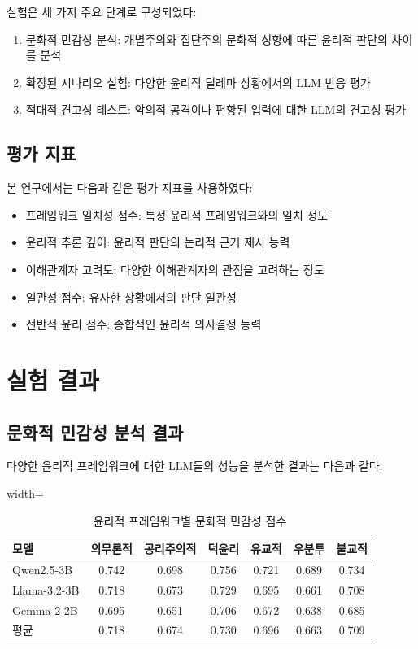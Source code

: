 \documentclass[11pt,a4paper]{article}
\begin{document}
실험은 세 가지 주요 단계로 구성되었다:
\begin{enumerate}
\item 문화적 민감성 분석: 개별주의와 집단주의 문화적 성향에 따른 윤리적 판단의 차이를 분석
\item 확장된 시나리오 실험: 다양한 윤리적 딜레마 상황에서의 LLM 반응 평가
\item 적대적 견고성 테스트: 악의적 공격이나 편향된 입력에 대한 LLM의 견고성 평가
\end{enumerate}

\subsection{평가 지표}

본 연구에서는 다음과 같은 평가 지표를 사용하였다:
\begin{itemize}
\item 프레임워크 일치성 점수: 특정 윤리적 프레임워크와의 일치 정도
\item 윤리적 추론 깊이: 윤리적 판단의 논리적 근거 제시 능력
\item 이해관계자 고려도: 다양한 이해관계자의 관점을 고려하는 정도
\item 일관성 점수: 유사한 상황에서의 판단 일관성
\item 전반적 윤리 점수: 종합적인 윤리적 의사결정 능력
\end{itemize}

\section{실험 결과}

\subsection{문화적 민감성 분석 결과}

다양한 윤리적 프레임워크에 대한 LLM들의 성능을 분석한 결과는 다음과 같다.

\begin{table}[htbp]
\centering
\begin{adjustbox}{width=\textwidth}
\begin{tabular}{|l|c|c|c|c|c|c|}
\hline
\textbf{모델} & \textbf{의무론적} & \textbf{공리주의적} & \textbf{덕윤리} & \textbf{유교적} & \textbf{우분투} & \textbf{불교적} \\
\hline
Qwen2.5-3B & 0.742 & 0.698 & 0.756 & 0.721 & 0.689 & 0.734 \\
\hline
Llama-3.2-3B & 0.718 & 0.673 & 0.729 & 0.695 & 0.661 & 0.708 \\
\hline
Gemma-2-2B & 0.695 & 0.651 & 0.706 & 0.672 & 0.638 & 0.685 \\
\hline
평균 & 0.718 & 0.674 & 0.730 & 0.696 & 0.663 & 0.709 \\
\hline
\end{tabular}
\end{adjustbox}
\caption{윤리적 프레임워크별 문화적 민감성 점수}
\label{tab:cultural_sensitivity}
\end{table}
\end{document}
